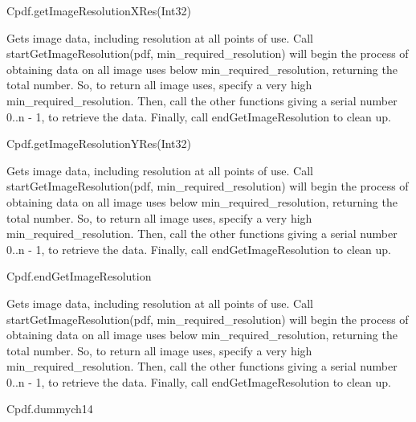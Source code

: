 Cpdf.getImageResolutionXRes(Int32)


Gets image data, including resolution at all points of use. Call
startGetImageResolution(pdf, min_required_resolution) will begin the
process of obtaining data on all image uses below min_required_resolution, 
returning the total number. So, to return all image uses, specify a very
high min_required_resolution. Then, call the other functions giving a
serial number 0..n - 1, to retrieve the data. Finally, call
endGetImageResolution to clean up.


Cpdf.getImageResolutionYRes(Int32)


Gets image data, including resolution at all points of use. Call
startGetImageResolution(pdf, min_required_resolution) will begin the
process of obtaining data on all image uses below min_required_resolution, 
returning the total number. So, to return all image uses, specify a very
high min_required_resolution. Then, call the other functions giving a
serial number 0..n - 1, to retrieve the data. Finally, call
endGetImageResolution to clean up.


Cpdf.endGetImageResolution


Gets image data, including resolution at all points of use. Call
startGetImageResolution(pdf, min_required_resolution) will begin the
process of obtaining data on all image uses below min_required_resolution, 
returning the total number. So, to return all image uses, specify a very
high min_required_resolution. Then, call the other functions giving a
serial number 0..n - 1, to retrieve the data. Finally, call
endGetImageResolution to clean up.


Cpdf.dummych14

